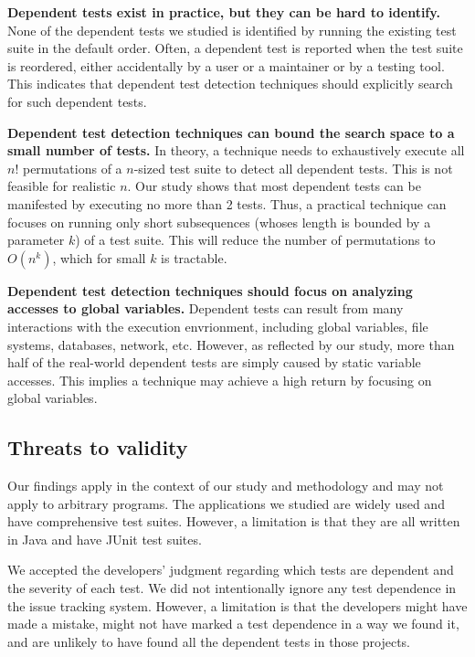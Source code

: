 \noindent \textbf{{Dependent tests exist in practice, but
they can be hard to identify.}}
None of the dependent tests we studied is identified by
running the existing test suite in the default order. Often,
a dependent test is reported when the
test suite is reordered, either accidentally by a user or
a maintainer or by a testing tool. This indicates that
dependent test detection techniques should
explicitly search for such dependent tests.

\vspace{1mm}
\noindent \textbf{Dependent test detection techniques
can bound the search space to a small number of tests.}
In theory, a technique needs to exhaustively execute
all $n!$ permutations of a $n$-sized
test suite to detect all dependent tests. This is
not feasible for realistic $n$.  Our study shows that
most dependent tests can be manifested by executing
no more than 2 tests. Thus, a practical technique
can focuses on running only short subsequences (whoses
length is bounded by a parameter $k$)
of a test suite. This will reduce the number of permutations
to $O(n^k)$, which for small $k$ is tractable.

\vspace{1mm}
\noindent \textbf{Dependent test detection techniques
should focus on analyzing accesses to global variables.}
Dependent tests can result from many
interactions with the execution envrionment, including
global variables, file systems, databases, network, etc.
However, as reflected by our study, more than half of the
real-world dependent tests are simply caused
by static variable accesses. This implies a technique
may achieve a high return by focusing on global variables.




\subsection{Threats to validity}

Our findings apply in the context of our study and methodology and may not
apply to arbitrary programs.
The applications we studied are widely used and have comprehensive test suites.
However, a limitation is that they are all written in 
Java and have JUnit test suites.  

We accepted the developers' judgment regarding which tests are dependent
and the severity of each test.  We did not intentionally ignore
any test dependence in the issue tracking system.
However, a limitation is that the developers might have made a mistake,
might not have marked a test dependence in a way we found it, and are
unlikely to have found all the dependent tests in those projects. 



